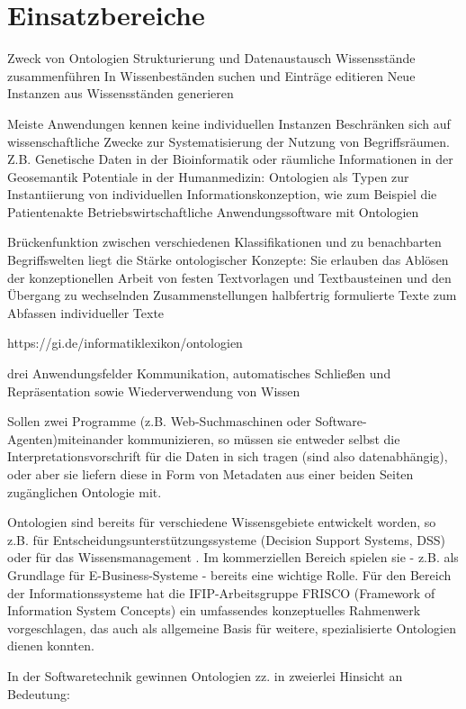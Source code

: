\section{Einsatzbereiche}
Zweck von Ontologien
	Strukturierung und Datenaustausch
	Wissensstände zusammenführen
	In Wissenbeständen suchen und Einträge editieren
	Neue Instanzen aus Wissensständen generieren
	
	Meiste Anwendungen kennen keine individuellen Instanzen 
	Beschränken sich auf wissenschaftliche Zwecke zur Systematisierung der Nutzung von Begriffsräumen. Z.B. Genetische Daten in der Bioinformatik oder räumliche Informationen in der Geosemantik
	Potentiale in der Humanmedizin: Ontologien als Typen zur Instantiierung von individuellen Informationskonzeption, wie zum Beispiel die Patientenakte
	Betriebswirtschaftliche Anwendungssoftware mit Ontologien
	
	Brückenfunktion zwischen verschiedenen Klassifikationen und zu benachbarten Begriffswelten liegt die Stärke ontologischer Konzepte: Sie erlauben das Ablösen der konzeptionellen Arbeit von festen Textvorlagen und Textbausteinen und den Übergang zu wechselnden Zusammenstellungen halbfertrig formulierte Texte zum Abfassen individueller Texte
	
	https://gi.de/informatiklexikon/ontologien

	drei Anwendungsfelder Kommunikation, automatisches Schließen und Repräsentation sowie Wiederverwendung von Wissen

	Sollen zwei Programme (z.B. Web-Suchmaschinen oder Software-Agenten)miteinander kommunizieren, so müssen sie entweder selbst die Interpretationsvorschrift für die Daten in sich tragen (sind also datenabhängig), oder aber sie liefern diese in Form von Metadaten aus einer beiden Seiten zugänglichen Ontologie mit.

	Ontologien sind bereits für verschiedene Wissensgebiete entwickelt worden, so z.B. für Entscheidungsunterstützungssysteme (Decision Support Systems, DSS) oder für das Wissensmanagement . Im kommerziellen Bereich spielen sie - z.B. als Grundlage für E-Business-Systeme - bereits eine wichtige Rolle. Für den Bereich der Informationssysteme hat die IFIP-Arbeitsgruppe FRISCO (Framework of Information System Concepts) ein umfassendes konzeptuelles Rahmenwerk vorgeschlagen, das auch als allgemeine Basis für weitere, spezialisierte Ontologien dienen konnten.

	In der Softwaretechnik gewinnen Ontologien zz. in zweierlei Hinsicht an Bedeutung:

